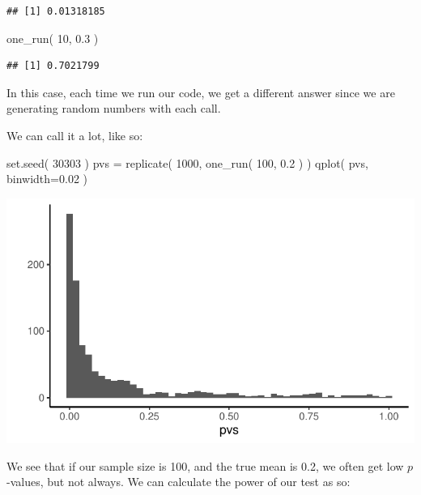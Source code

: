 \documentclass[
]{book}
\newenvironment{Shaded}{\begin{snugshade}}{\end{snugshade}}
\newcommand{\AttributeTok}[1]{\textcolor[rgb]{0.77,0.63,0.00}{#1}}
\newcommand{\DecValTok}[1]{\textcolor[rgb]{0.00,0.00,0.81}{#1}}
\newcommand{\FloatTok}[1]{\textcolor[rgb]{0.00,0.00,0.81}{#1}}
\newcommand{\FunctionTok}[1]{\textcolor[rgb]{0.00,0.00,0.00}{#1}}
\newcommand{\NormalTok}[1]{#1}
\newcommand{\OtherTok}[1]{\textcolor[rgb]{0.56,0.35,0.01}{#1}}
\begin{document}
\begin{verbatim}
## [1] 0.01318185
\end{verbatim}

\begin{Shaded}
\begin{Highlighting}[]
\FunctionTok{one\_run}\NormalTok{( }\DecValTok{10}\NormalTok{, }\FloatTok{0.3}\NormalTok{ )}
\end{Highlighting}
\end{Shaded}

\begin{verbatim}
## [1] 0.7021799
\end{verbatim}

In this case, each time we run our code, we get a different answer since we are generating random numbers with each call.

We can call it a lot, like so:

\begin{Shaded}
\begin{Highlighting}[]
\FunctionTok{set.seed}\NormalTok{( }\DecValTok{30303}\NormalTok{ )}
\NormalTok{pvs }\OtherTok{=} \FunctionTok{replicate}\NormalTok{( }\DecValTok{1000}\NormalTok{, }\FunctionTok{one\_run}\NormalTok{( }\DecValTok{100}\NormalTok{, }\FloatTok{0.2}\NormalTok{ ) )}
\FunctionTok{qplot}\NormalTok{( pvs, }\AttributeTok{binwidth=}\FloatTok{0.02}\NormalTok{ )}
\end{Highlighting}
\end{Shaded}

\begin{center}\includegraphics[width=0.75\linewidth]{Designing-Simulations-in-R_files/figure-latex/pvalue_plot-1} \end{center}

We see that if our sample size is 100, and the true mean is 0.2, we often get low \(p\)-values, but not always. We can calculate the power of our test as so:
\end{document}
